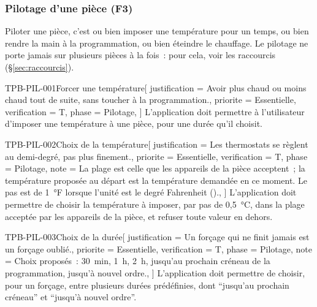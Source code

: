 \subsubsection{Pilotage d'une pièce (F3)}

Piloter une pièce, c'est ou bien imposer une température pour un temps, ou bien rendre la
main à la programmation, ou bien éteindre le chauffage. Le pilotage ne porte jamais sur
plusieurs pièces à la fois~: pour cela, voir les raccourcis (§\ref{sec:raccourcis}).

\begin{exigence}{TPB-PIL-001}{Forcer une température}[
    justification = {Avoir plus chaud ou moins chaud tout de suite, sans toucher à la
                     programmation.},
    priorite      = {Essentielle},
    verification  = {T},
    phase         = {Pilotage},
  ]
  L'application doit permettre à l'utilisateur d'imposer une température à une pièce,
  pour une durée qu'il choisit.
\end{exigence}

\begin{exigence}{TPB-PIL-002}{Choix de la température}[
    justification = {Les thermostats se règlent au demi-degré, pas plus finement.},
    priorite      = {Essentielle},
    verification  = {T},
    phase         = {Pilotage},
    note          = {La plage est celle que les appareils de la pièce acceptent~; la
                     température proposée au départ est la température demandée en ce
                     moment. Le pas est de 1~°F lorsque l'unité est le degré Fahrenheit
                     ().},
  ]
  L'application doit permettre de choisir la température à imposer, par pas de
  0,5~°C, dans la plage acceptée par les appareils de la pièce, et refuser toute valeur
  en dehors.
\end{exigence}

\begin{exigence}{TPB-PIL-003}{Choix de la durée}[
    justification = {Un forçage qui ne finit jamais est un forçage oublié.},
    priorite      = {Essentielle},
    verification  = {T},
    phase         = {Pilotage},
    note          = {Choix proposés~: 30~min, 1~h, 2~h, jusqu'au prochain créneau de la
                     programmation, jusqu'à nouvel ordre.},
  ]
  L'application doit permettre de choisir, pour un forçage, entre plusieurs durées
  prédéfinies, dont \enquote{jusqu'au prochain créneau} et \enquote{jusqu'à nouvel ordre}.
\end{exigence}

